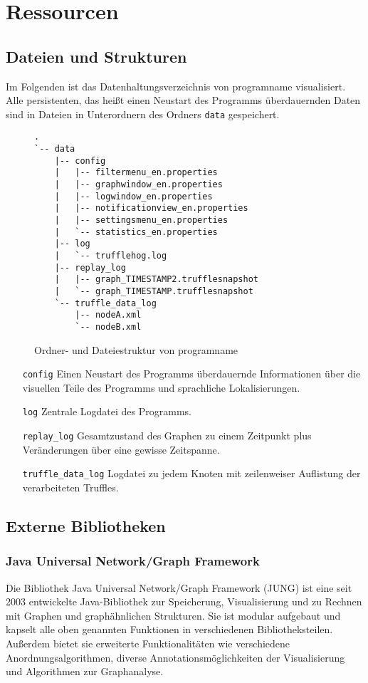 \chapter{Ressourcen}
\section{Dateien und Strukturen}
Im Folgenden ist das Datenhaltungsverzeichnis von \gls{programname} visualisiert. Alle persistenten, das heißt einen Neustart des Programms überdauernden Daten sind in Dateien in Unterordnern des Ordners \texttt{data} gespeichert.  
\begin{figure}[htb]
  \centering
\begin{verbatim}
.
`-- data
    |-- config
    |   |-- filtermenu_en.properties
    |   |-- graphwindow_en.properties
    |   |-- logwindow_en.properties
    |   |-- notificationview_en.properties
    |   |-- settingsmenu_en.properties
    |   `-- statistics_en.properties
    |-- log
    |   `-- trufflehog.log
    |-- replay_log
    |   |-- graph_TIMESTAMP2.trufflesnapshot
    |   `-- graph_TIMESTAMP.trufflesnapshot
    `-- truffle_data_log
        |-- nodeA.xml
        `-- nodeB.xml
\end{verbatim}
  \caption[Ordner- und Dateiestruktur von \gls{programname}]{Ordner- und Dateiestruktur von \gls{programname}}
\end{figure}
\begin{itemize}
\item[\texttt{config}] Einen Neustart des Programms überdauernde Informationen über die visuellen Teile des Programms und sprachliche Lokalisierungen. 
\item[\texttt{log}] Zentrale Logdatei des Programms. 
\item[\texttt{replay\_log}] Gesamtzustand des Graphen zu einem Zeitpunkt plus Veränderungen über eine gewisse Zeitspanne. 
\item[\texttt{truffle\_data\_log}] Logdatei zu jedem Knoten mit zeilenweiser Auflistung der verarbeiteten Truffles.
\end{itemize}

\section{Externe Bibliotheken}
\subsection{Java Universal Network/Graph Framework}
Die Bibliothek Java Universal Network/Graph Framework (JUNG) ist eine seit 2003 entwickelte Java-Bibliothek zur Speicherung, Visualisierung und zu Rechnen mit Graphen und graphähnlichen Strukturen. Sie ist modular aufgebaut und kapselt alle oben genannten Funktionen in verschiedenen Bibliotheksteilen. Außerdem bietet sie erweiterte Funktionalitäten wie verschiedene Anordnungsalgorithmen, diverse Annotationsmöglichkeiten der Visualisierung und Algorithmen zur Graphanalyse. 
